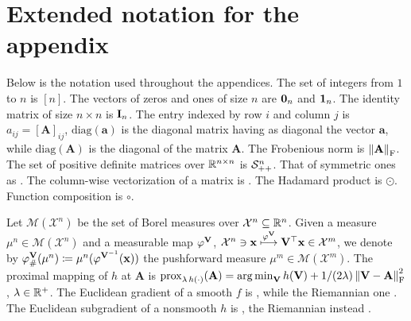 
\section{Extended notation for the appendix}\label{app:eNot}
Below is the notation used throughout the appendices.
The set of integers from $1$ to $n$ is $[n]$.
The vectors of zeros and ones of size $n$ are $\boldsymbol{0}_n$ and $\boldsymbol{1}_n$.
The identity matrix of size $n \times n$ is $\mathbf{I}_n$. 
The entry indexed by row $i$ and column $j$ is $a_{ij}=[\mathbf{A}]_{ij}$, $\mathrm{diag}(\mathbf{a})$ is the diagonal matrix having as diagonal the vector $\mathbf{a}$, while $\mathrm{diag}(\mathbf{A})$ is the diagonal of the matrix $\mathbf{A}$. 
The Frobenious norm is $\norm{\mathbf{A}}_{\mathrm{F}}$.
The set of positive definite matrices over $\mathbb{R}^{n\times n}$ is $\mathcal{S}_{++}^n$.
That of symmetric ones as .
The column-wise vectorization of a matrix is \myvec{}. 
The Hadamard product is $\odot$.
Function composition is $\circ$.

Let $\mathcal{M}(\mathcal{X}^n)$ be the set of Borel measures over $\mathcal{X}^n \subseteq \mathbb{R}^n$.
Given a measure $\mu^n \in \mathcal{M}(\mathcal{X}^n)$ and a measurable map $\varphi^{\mathbf{V}}$, $\mathcal{X}^n \ni \mathbf{x} \overset{\varphi^{\mathbf{V}}}{\longmapsto} \mathbf{V}^\top \mathbf{x} \in \mathcal{X}^m$, we denote by $\varphi^{\mathbf{V}}_{\#}(\mu^n) \coloneqq \mu^n(\varphi^{\mathbf{V}^{-1}}(\mathbf{x}))$ the pushforward measure $\mu^m \in \mathcal{M}(\mathcal{X}^m)$. 
The proximal mapping of $h$ at $\mathbf{A}$ is $\mathrm{prox}_{\lambda \, h(\cdot)}(\mathbf{A})= \operatorname*{arg\,min}_{\mathbf{V}} h(\mathbf{V}) + 1/(2\lambda) \, \norm{\mathbf{V} - \mathbf{A}}_{\mathrm{F}}^2$, $\lambda \in \mathbb{R}^+$. 
The Euclidean gradient of a smooth $f$ is , while the Riemannian one .
The Euclidean subgradient of a nonsmooth $h$ is , the Riemannian instead .